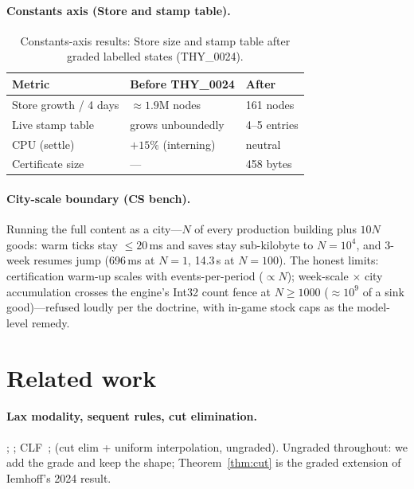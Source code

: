 \documentclass[11pt]{article}
\theoremstyle{definition}
\theoremstyle{remark}
\begin{document}
\paragraph{Constants axis (Store and stamp table).}

\begin{table}[ht]
\centering
\begin{tabular}{@{}lll@{}}
\toprule
Metric                    & Before THY\_0024      & After \\
\midrule
Store growth / 4 days     & $\approx 1.9$M nodes  & 161 nodes \\
Live stamp table          & grows unboundedly     & 4--5 entries \\
CPU (settle)              & $+15\%$ (interning)   & neutral \\
Certificate size          & ---                   & 458 bytes \\
\bottomrule
\end{tabular}
\caption{Constants-axis results: Store size and stamp table after graded labelled
  states (THY\_0024).}
\label{tab:constants-axis}
\end{table}

\paragraph{City-scale boundary (CS bench).} Running the full content as a
city---$N$ of every production building plus $10N$ goods: warm ticks stay $\leq
20$\,ms and saves stay sub-kilobyte to $N = 10^4$, and 3-week resumes jump
(696\,ms at $N = 1$, 14.3\,s at $N = 100$).  The honest limits: certification
warm-up scales with events-per-period ($\propto N$); week-scale $\times$ city
accumulation crosses the engine's Int32 count fence at $N \geq 1000$ ($\approx
10^9$ of a sink good)---refused loudly per the doctrine, with in-game stock caps
as the model-level remedy.

\section{Related work}
\label{sec:related}

\paragraph{Lax modality, sequent rules, cut elimination.}
\cite{FairtloughMendler1997}; \cite{PfenningDavies2001}; CLF~\cite{Watkins2002CLF};
\cite{Iemhoff2024} (cut elim + uniform interpolation, ungraded).
Ungraded throughout: we add the grade and keep the shape;
Theorem~\ref{thm:cut} is the graded extension of Iemhoff's 2024 result.
\end{document}
